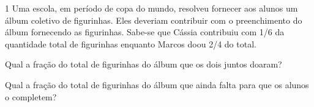 

\num{1} Uma escola, em período de copa do mundo, resolveu fornecer aos
alunos um álbum coletivo de figurinhas. Eles deveriam contribuir com o
preenchimento do álbum fornecendo as figurinhas. Sabe-se que Cássia
contribuiu com 1/6 da quantidade total de figurinhas enquanto Marcos doou 2/4 do total.

\begin{escolha}
\item
  Qual a fração do total de figurinhas do álbum que os dois juntos doaram?


\item
  Qual a fração do total de figurinhas do álbum que ainda falta para que os
  alunos o completem?

\end{escolha}

